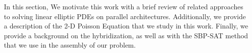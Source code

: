 %
%
%
In this section, We motivate this work with a brief review of related approaches to solving linear elliptic PDEs on parallel architectures. 
Additionally, we provide a description of the 2-D Poisson Equation that we study in this work. 
Finally, we provide a background on the hybridization, as well as with the SBP-SAT method that we use in the assembly of our problem.
 